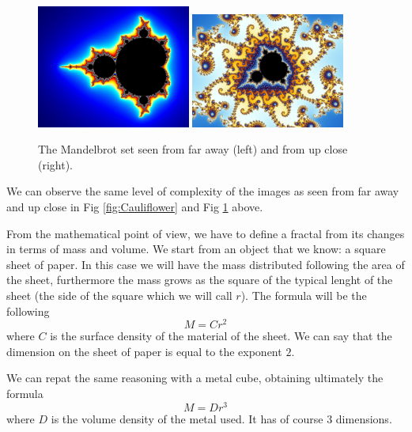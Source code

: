 \documentclass[a4paper,12pt]{article}
\begin{document}
\begin{figure}[h]
    \centering
    \begin{minipage}{1\textwidth}
        \centering
        \includegraphics[width = 0.45\textwidth]{Mandelbrot_far.jpg}
        \includegraphics[width = 0.45\textwidth]{MAndelbrot_close.jpg}
    \end{minipage}
    \caption{The Mandelbrot set seen from far away (left) and from up close (right).}
    \label{fig:Mandelbrot}
\end{figure}

\par We can observe the same level of complexity of the images as seen from far away 
and up close in Fig \ref{fig:Cauliflower} and Fig \ref{fig:Mandelbrot} above.

\par From the mathematical point of view, we have to define a fractal from its changes 
in terms of mass and volume. We start from an object that we know: a square sheet 
of paper. In this case we will have the mass distributed following the area of 
the sheet, furthermore the mass grows as the square of the typical lenght of the 
sheet (the side of the square which we will call $r$). The formula will be the 
following 
\[ M = C r^2 \]
where $C$ is the surface density of the material of the sheet. We can say that the 
dimension on the sheet of paper is equal to the exponent $2$.

We can repat the same reasoning with a metal cube, obtaining ultimately the formula
\[ M = D r^3 \]
where $D$ is the volume density of the metal used. It has of course $3$ dimensions.
\end{document}
